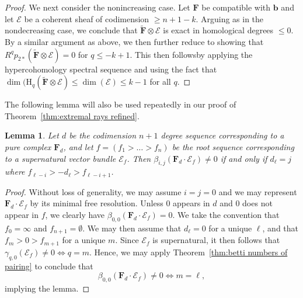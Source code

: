 \documentclass[12pt]{amsart}
\newtheorem{lemma}{Lemma}[section]
\theoremstyle{definition}
\theoremstyle{remark}
\newcommand{\HH}{\mathrm{H}}
\newcommand{\bb}{\mathbf{b}}
\newcommand{\cE}{\mathcal{E}}
\newcommand{\FF}{\mathbf{F}}
\begin{document}
\begin{proof}
We next consider the nonincreasing case.  Let $\FF$ be compatible with $\bb$ and let $\cE$ be a coherent sheaf of codimension $\geq n+1-k$.  Arguing as in the nondecreasing case, we conclude that $\widetilde{\FF}\otimes \cE$ is exact in homological degrees $\leq 0$.
By a similar argument as above, we then further reduce to showing that  $R^qp_{2*}\left(\widetilde{\FF}\otimes \cE\right)=0$ for $q\leq -k+1$.  This then followsby applying the hypercohomology spectral sequence and using the fact that $\dim(\HH_q(\widetilde{\FF}\otimes \cE)\leq \dim(\cE)\leq k-1$ for all $q$.
\end{proof}


The following lemma will also be used repeatedly in our proof of Theorem~\ref{thm:extremal rays refined}.
\begin{lemma}\label{lem:pure and supernatural}
Let $d$ be the codimension $n+1$ degree sequence corresponding to a pure complex $\FF_d$, and let $f=(f_1>\dots >f_n)$ be the root sequence corresponding to a supernatural vector bundle $\cE_f$.  Then
$
\beta_{i,j}(\FF_d\cdot \cE_f)\ne 0
$
if and only if $d_\ell=j$ where $f_{\ell-i}>-d_{\ell}>f_{\ell-i+1}$.\end{lemma}
\begin{proof}
Without loss of generality, we may assume $i=j=0$ and we may represent $\FF_d\cdot \cE_f$ by its minimal free resolution. Unless $0$ appears in $d$ and $0$ does not appear in $f$, we clearly have $\beta_{0,0}(\FF_d\cdot \cE_f)=0$.  We take the convention that $f_0=\infty$ and $f_{n+1}=\emptyset$. We may then assume that $d_{\ell}=0$ for a unique $\ell$, and that $f_m>0>f_{m+1}$ for a unique $m$.
Since $\cE_f$ is supernatural, it then follows that $\gamma_{q,0}(\cE_f)\ne 0 \iff q=m$.  Hence, we may apply Theorem~\ref{thm:betti numbers of pairing} to conclude that
\[
\beta_{0,0}(\FF_d\cdot \cE_f)\ne 0 \iff m=\ell,
\]
implying the lemma.
\end{proof}
\end{document}
